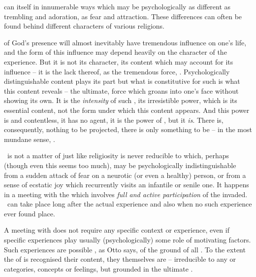  can  itself in innumerable ways which may
be psychologically as different as trembling and adoration, as fear
and attraction.  These differences can often be found 
behind different  characters of various religions.  

 of God's presence will almost inevitably have
tremendous influence on one's life, and the form of this influence may
depend heavily on the character of the experience.  But it is not its
character, its content which may account for its influence -- it is
the lack thereof,  as the tremendous force, 
.  Psychologically distinguishable content plays
its part but what is constitutive for such  is what
this content reveals -- the ultimate,  force which groans
into one's face without showing its own.  It is the {\em intensity} of
such , its irresistible power, which is its
essential content, not the form under which this content appears.  And
this power is  and contentless, it has no agent, it is
the power of , but it {\em is}. There is, 
consequently, nothing to be projected, there is only something to be 
 -- in the most mundane sense, . 

\pa
\Sch\ is not a matter of  just like religiosity is
never reducible to  which, perhaps (though 
 even this  seems too much), may be
psychologically indistinguishable from a sudden attack of fear on a
neurotic (or even a healthy) person, or from a sense of ecstatic joy which
recurrently visits an 
infantile or {senile} one. It happens in a meeting with the 
 which involves {\em full and active
participation} of the invaded.  \Sch\ can take place long after the
actual experience and also when no such experience ever found place.

A meeting with   
does not require any specific context or experience, even if
specific experiences play usually (psychologically) some role of
motivating factors.
%
Such experiences are possible , as Otto says,
 of the  ground of all
.  To the extent the  of  is
recognised  their content, 
they themselves are  -- irreducible to any  or categories, concepts or feelings, but
grounded in the ultimate .

